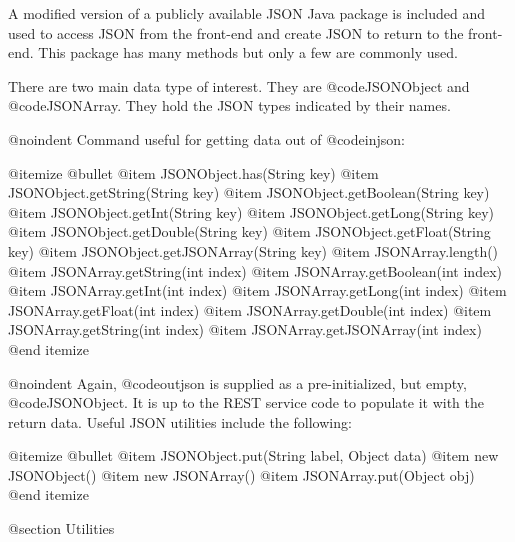 A modified version of a publicly available JSON Java package is
included and used to access JSON from the front-end and create JSON to
return to the front-end.  This package has many methods but only a few are
commonly used.

There are two main data type of interest.  They are @code{JSONObject} and
@code{JSONArray}.  They hold the JSON types indicated by their names.

@noindent
Command useful for getting data out of @code{injson}:

@itemize @bullet
@item
JSONObject.has(String key)
@item
JSONObject.getString(String key)
@item
JSONObject.getBoolean(String key)
@item
JSONObject.getInt(String key)
@item
JSONObject.getLong(String key)
@item
JSONObject.getDouble(String key)
@item
JSONObject.getFloat(String key)
@item
JSONObject.getJSONArray(String key)
@item
JSONArray.length()
@item
JSONArray.getString(int index)
@item
JSONArray.getBoolean(int index)
@item
JSONArray.getInt(int index)
@item
JSONArray.getLong(int index)
@item
JSONArray.getFloat(int index)
@item
JSONArray.getDouble(int index)
@item
JSONArray.getString(int index)
@item
JSONArray.getJSONArray(int index)
@end itemize

@noindent
Again, @code{outjson} is supplied as a pre-initialized, but empty,
@code{JSONObject}.  It is up to the REST service code to populate it
with the return data.  Useful JSON utilities include the following:

@itemize @bullet
@item
JSONObject.put(String label, Object data)
@item
new JSONObject()
@item
new JSONArray()
@item
JSONArray.put(Object obj)
@end itemize


@section Utilities
